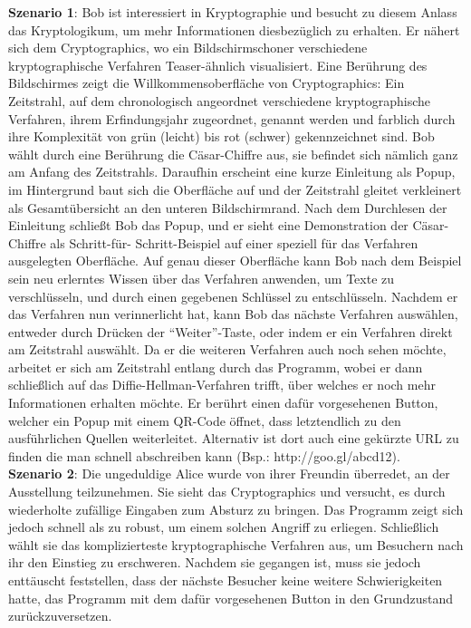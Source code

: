\documentclass{article}
\begin{document}
\textbf{Szenario 1}:
Bob ist interessiert in Kryptographie und besucht zu diesem Anlass das \gls{Kryptologikum}, um mehr Informationen diesbezüglich zu erhalten. Er nähert sich dem \gls{Cryptographics}, wo ein Bildschirmschoner verschiedene kryptographische Verfahren Teaser-ähnlich visualisiert. Eine Berührung des Bildschirmes zeigt die Willkommensoberfläche von \gls{Cryptographics}: Ein Zeitstrahl, auf dem chronologisch angeordnet verschiedene kryptographische Verfahren, ihrem Erfindungsjahr zugeordnet, genannt werden und farblich durch ihre Komplexität von grün (leicht) bis rot (schwer) gekennzeichnet sind. Bob wählt durch eine Berührung die Cäsar-Chiffre aus, sie befindet sich nämlich ganz am Anfang des Zeitstrahls. Daraufhin erscheint eine kurze Einleitung als Popup, im Hintergrund baut sich die Oberfläche auf und der Zeitstrahl gleitet verkleinert als Gesamtübersicht an den unteren Bildschirmrand. Nach dem Durchlesen der Einleitung schließt Bob das Popup, und er sieht eine Demonstration der Cäsar-Chiffre als Schritt-für-
Schritt-Beispiel auf 
einer speziell für das Verfahren ausgelegten Oberfläche. Auf genau dieser Oberfläche kann Bob nach dem Beispiel sein neu erlerntes Wissen über das Verfahren anwenden, um Texte zu verschlüsseln, und durch einen gegebenen Schlüssel zu entschlüsseln. Nachdem er das Verfahren nun verinnerlicht hat, kann Bob das nächste Verfahren auswählen, entweder durch Drücken der “Weiter”-Taste, oder indem er ein Verfahren direkt am Zeitstrahl auswählt. Da er die weiteren Verfahren auch noch sehen möchte, arbeitet er sich am Zeitstrahl entlang durch das Programm, wobei er dann schließlich auf das Diffie-Hellman-Verfahren trifft, über welches er noch mehr Informationen erhalten möchte. Er berührt einen dafür vorgesehenen Button, welcher ein Popup mit einem QR-Code öffnet, dass letztendlich zu den ausführlichen Quellen weiterleitet. Alternativ ist dort auch eine gekürzte URL zu finden die man schnell abschreiben kann (Bsp.: http://goo.gl/abcd12).\\

\textbf{Szenario 2}:
Die ungeduldige Alice wurde von ihrer Freundin überredet, an der Ausstellung teilzunehmen. Sie sieht das \gls{Cryptographics} und versucht, es durch wiederholte zufällige Eingaben zum Absturz zu bringen. Das Programm zeigt sich jedoch schnell als zu robust, um einem solchen Angriff zu erliegen. Schließlich wählt sie das komplizierteste kryptographische Verfahren aus, um Besuchern nach ihr den Einstieg zu erschweren. Nachdem sie gegangen ist, muss sie jedoch enttäuscht feststellen, dass der nächste Besucher keine weitere Schwierigkeiten hatte, das Programm mit dem dafür vorgesehenen Button in den Grundzustand zurückzuversetzen.\\
\end{document}
